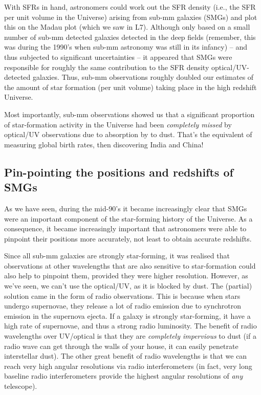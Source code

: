 \documentclass[11pt]{article}
\begin{document}
With SFRs in hand, astronomers could work out the SFR density (i.e.,
the SFR per unit volume in the Universe) arising from sub-mm galaxies
(SMGs) and plot this on the Madau plot (which we saw in L7). Although
only based on a small number of sub-mm detected galaxies detected in
the deep fields (remember, this was during the 1990's when sub-mm
astronomy was still in its infancy) -- and thus subjected to
significant uncertainties -- it appeared that SMGs were
responsible for roughly the same contribution to the SFR density
optical/UV-detected galaxies. Thus, sub-mm observations roughly
doubled our estimates of the amount of star formation (per unit
volume) taking place in the high redshift Universe.

Most importantly, sub-mm observations showed us that a significant
proportion of star-formation activity in the Universe had been {\it
  completely missed} by optical/UV observations due to absorption by
to dust. That's the equivalent of measuring global birth rates, then
discovering India and China!

\subsection{Pin-pointing the positions and redshifts of SMGs}
As we have seen, during the mid-90's it became increasingly clear
that SMGs were an important component of the star-forming history of
the Universe. As a consequence, it became increasingly important that
astronomers were able to pinpoint their positions more accurately, not
least to obtain accurate redshifts.

Since all sub-mm galaxies are strongly star-forming, it was realised
that observations at other wavelengths that are also sensitive to
star-formation could also help to pinpoint them, provided they were
higher resolution. However, as we've seen, we can't use the
optical/UV, as it is blocked by dust. The (partial) solution came in
the form of radio observations. This is because when stars undergo
supernovae, they release a lot of radio emission due to synchrotron
emission in the supernova ejecta. If a galaxy is strongly
star-forming, it have a high rate of supernovae, and thus a strong
radio luminosity. The benefit of radio wavelengths over UV/optical is
that they are {\it completely impervious} to dust (if a radio wave can
get through the walls of your house, it can easily penetrate
interstellar dust). The other great benefit of radio wavelengths is
that we can reach very high angular resolutions via radio
interferometers (in fact, very long baseline radio interferometers
provide the highest angular resolutions of {\it any} telescope).
\end{document}
